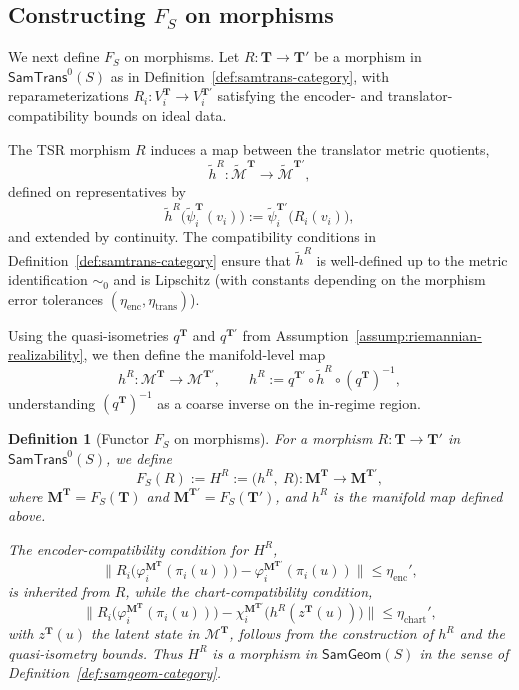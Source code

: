 \documentclass[11pt]{article}
\newtheorem{definition}{Definition}
\newcommand{\SamTrans}{\mathsf{SamTrans}}
\newcommand{\SamGeom}{\mathsf{SamGeom}}
\begin{document}
\subsection{Constructing \texorpdfstring{$F_S$}{F\_S} on morphisms}
\label{subsec:F-on-morphisms}

We next define $F_S$ on morphisms.  Let
$R : \mathbf{T} \to \mathbf{T}'$ be a morphism in
$\SamTrans^0(S)$ as in Definition~\ref{def:samtrans-category},
with reparameterizations
$R_i : V_i^{\mathbf{T}} \to V_i^{\mathbf{T}'}$ satisfying the
encoder- and translator-compatibility bounds on ideal data.

The TSR morphism $R$ induces a map between the translator metric
quotients,
\[
\tilde h^R :
\widetilde{\mathcal{M}}^{\mathbf{T}}
\longrightarrow
\widetilde{\mathcal{M}}^{\mathbf{T}'},
\]
defined on representatives by
\[
\tilde h^R\bigl(\tilde\psi_i^{\mathbf{T}}(v_i)\bigr)
:=
\tilde\psi_i^{\mathbf{T}'}\bigl(R_i(v_i)\bigr),
\]
and extended by continuity.  The compatibility conditions in
Definition~\ref{def:samtrans-category} ensure that $\tilde h^R$ is
well-defined up to the metric identification $\sim_0$ and is
Lipschitz (with constants depending on the morphism error
tolerances $(\eta_{\mathrm{enc}}, \eta_{\mathrm{trans}})$).

Using the quasi-isometries $q^{\mathbf{T}}$ and $q^{\mathbf{T}'}$ from
Assumption~\ref{assump:riemannian-realizability}, we then define the
manifold-level map
\[
h^R :
\mathcal{M}^{\mathbf{T}}
\longrightarrow
\mathcal{M}^{\mathbf{T}'},
\qquad
h^R
:=
q^{\mathbf{T}'}
\circ \tilde h^R
\circ (q^{\mathbf{T}})^{-1},
\]
understanding $(q^{\mathbf{T}})^{-1}$ as a coarse inverse on the
in-regime region.

\begin{definition}[Functor $F_S$ on morphisms]
\label{def:F-on-morphisms}
For a morphism $R : \mathbf{T} \to \mathbf{T}'$ in
$\SamTrans^0(S)$, we define
\[
F_S(R)
:=
H^R
:=
\bigl(h^R,\ R\bigr)
:
\mathbf{M}^{\mathbf{T}}
\longrightarrow
\mathbf{M}^{\mathbf{T}'},
\]
where $\mathbf{M}^{\mathbf{T}} = F_S(\mathbf{T})$ and
$\mathbf{M}^{\mathbf{T}'} = F_S(\mathbf{T}')$, and $h^R$ is the
manifold map defined above.

The encoder-compatibility condition for $H^R$,
\[
\bigl\|
  R_i\bigl(\varphi_i^{\mathbf{M}^{\mathbf{T}}}(\pi_i(u))\bigr)
  -
  \varphi_i^{\mathbf{M}^{\mathbf{T}'}}(\pi_i(u))
\bigr\|
\le \eta_{\mathrm{enc}}',
\]
is inherited from $R$, while the chart-compatibility condition,
\[
\bigl\|
  R_i\bigl(\varphi_i^{\mathbf{M}^{\mathbf{T}}}(\pi_i(u))\bigr)
  -
  \chi_i^{\mathbf{M}^{\mathbf{T}'}}\bigl(h^R(z^{\mathbf{T}}(u))\bigr)
\bigr\|
\le \eta_{\mathrm{chart}}',
\]
with $z^{\mathbf{T}}(u)$ the latent state in $\mathcal{M}^{\mathbf{T}}$,
follows from the construction of $h^R$ and the quasi-isometry bounds.
Thus $H^R$ is a morphism in $\SamGeom(S)$ in the sense of
Definition~\ref{def:samgeom-category}.
\end{definition}
\end{document}

